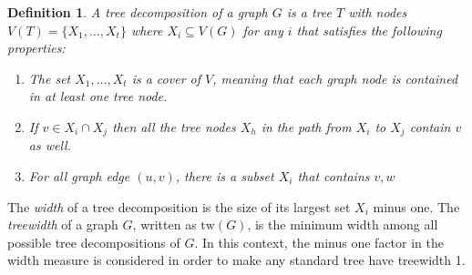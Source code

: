 \documentclass[12pt,a4paper]{article}
\newtheorem{definition}{Definition}
\begin{document}
    \begin{definition}
      A tree decomposition of a graph $G$ is a tree $T$ with nodes $V(T) = \{X_1, \ldots, X_t\}$ where $X_i \subseteq V(G)$ for any $i$ that satisfies the following properties:
      \begin{enumerate}
        \item The set $X_1, \ldots, X_t$ is a cover of $V$, meaning that each graph node is contained in at least one tree node.
        \item If $v \in X_i \cap X_j$ then all the tree nodes $X_h$ in the path from $X_i$ to $X_j$ contain $v$ as well.
        \item For all graph edge $(u,v)$, there is a subset $X_i$ that contains $v,w$
      \end{enumerate}
    \end{definition}

    The \textit{width} of a tree decomposition is the size of its largest set $X_i$ minus one. The \textit{treewidth} of a graph $G$, written as $\mathrm{tw}(G)$, is the minimum width among all possible tree decompositions of $G$. In this context, the minus one factor in the width measure is considered in order to make any standard tree have treewidth 1.
\end{document}
